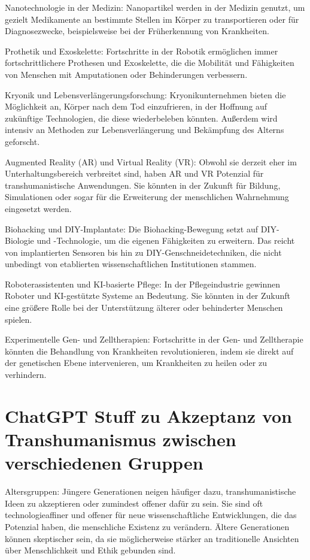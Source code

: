 \documentclass[a4paper,
DIV=13,
12pt,
BCOR=10mm,
department=FakEI,
twoside,
parskip=half,
automark,
]{OTHRartcl}
\begin{document}
Nanotechnologie in der Medizin: Nanopartikel werden in der Medizin genutzt, um gezielt Medikamente an bestimmte Stellen im Körper zu transportieren oder für Diagnosezwecke, beispielsweise bei der Früherkennung von Krankheiten.

Prothetik und Exoskelette: Fortschritte in der Robotik ermöglichen immer fortschrittlichere Prothesen und Exoskelette, die die Mobilität und Fähigkeiten von Menschen mit Amputationen oder Behinderungen verbessern.

Kryonik und Lebensverlängerungsforschung: Kryonikunternehmen bieten die Möglichkeit an, Körper nach dem Tod einzufrieren, in der Hoffnung auf zukünftige Technologien, die diese wiederbeleben könnten. Außerdem wird intensiv an Methoden zur Lebensverlängerung und Bekämpfung des Alterns geforscht.

Augmented Reality (AR) und Virtual Reality (VR): Obwohl sie derzeit eher im Unterhaltungsbereich verbreitet sind, haben AR und VR Potenzial für transhumanistische Anwendungen. Sie könnten in der Zukunft für Bildung, Simulationen oder sogar für die Erweiterung der menschlichen Wahrnehmung eingesetzt werden.

Biohacking und DIY-Implantate: Die Biohacking-Bewegung setzt auf DIY-Biologie und -Technologie, um die eigenen Fähigkeiten zu erweitern. Das reicht von implantierten Sensoren bis hin zu DIY-Genschneidetechniken, die nicht unbedingt von etablierten wissenschaftlichen Institutionen stammen.

Roboterassistenten und KI-basierte Pflege: In der Pflegeindustrie gewinnen Roboter und KI-gestützte Systeme an Bedeutung. Sie könnten in der Zukunft eine größere Rolle bei der Unterstützung älterer oder behinderter Menschen spielen.

Experimentelle Gen- und Zelltherapien: Fortschritte in der Gen- und Zelltherapie könnten die Behandlung von Krankheiten revolutionieren, indem sie direkt auf der genetischen Ebene intervenieren, um Krankheiten zu heilen oder zu verhindern.


\section*{ChatGPT Stuff zu Akzeptanz von Transhumanismus zwischen verschiedenen Gruppen}
Altersgruppen: Jüngere Generationen neigen häufiger dazu, transhumanistische Ideen zu akzeptieren oder zumindest offener dafür zu sein. Sie sind oft technologieaffiner und offener für neue wissenschaftliche Entwicklungen, die das Potenzial haben, die menschliche Existenz zu verändern. Ältere Generationen können skeptischer sein, da sie möglicherweise stärker an traditionelle Ansichten über Menschlichkeit und Ethik gebunden sind.
\end{document}
